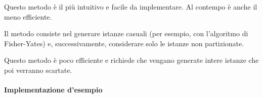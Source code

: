 \documentclass[../../../../relazione.tex]{subfiles}
\begin{document}
Questo metodo è il più intuitivo e facile da implementare.
Al contempo è anche il meno efficiente.

Il metodo consiste nel generare istanze casuali (per esempio, con l'algoritmo di Fisher-Yates) e, successivamente, considerare solo le istanze non partizionate.

Questo metodo è poco efficiente e richiede che vengano generate intere istanze che poi verranno scartate.

\paragraph{Implementazione d'esempio}

\end{document}
